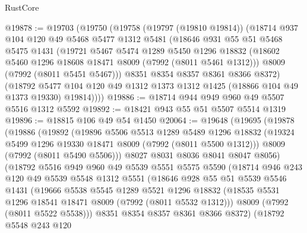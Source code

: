 \begin{lexlean}{RustCore}
\begin{coremodule}
@19878 := @19703
    (@19750
      (@19758
        (@19797 (@19810 @19814))
        (@18714
          @937
          @104
          @120
          @49
          @5468
          @5477
          @1312
          @5481
          (@18646
            @931
            @55
            @51
            @5468
            @5475
            @1431
            (@19721
              @5467
              @5474
              @1289
              @5450
              @1296
              @18832
              (@18602 @5460 @1296 @18608 @18471 @8009 (@7992 (@8011 @5461 @1312)))
              @8009
              (@7992 (@8011 @5451 @5467)))
            @8351
            @8354
            @8357
            @8361
            @8366
            @8372)
          (@18792
            @5477
            @104
            @120
            @49
            @1312
            @1373
            @1312
            @1425
            (@18866 @104 @49 @1373 @19330)
            @19814))))
@19886 := @18714 @944 @949 @960 @49 @5507 @5516 @1312 @5592
@19892 := @18421 @943 @55 @51 @5507 @5514 @1319
@19896 := @18815 @106 @49 @54 @1450
@20064 := @19648
    (@19695
      (@19878
        (@19886
          (@19892
            (@19896
              @5506
              @5513
              @1289
              @5489
              @1296
              @18832
              (@19324 @5499 @1296 @19330 @18471 @8009 (@7992 (@8011 @5500 @1312)))
              @8009
              (@7992 (@8011 @5490 @5506)))
            @8027
            @8031
            @8036
            @8041
            @8047
            @8056)
          (@18792
            @5516
            @949
            @960
            @49
            @5539
            @5551
            @5575
            @5590
            (@18714
              @946
              @243
              @120
              @49
              @5539
              @5548
              @1312
              @5551
              (@18646
                @928
                @55
                @51
                @5539
                @5546
                @1431
                (@19666
                  @5538
                  @5545
                  @1289
                  @5521
                  @1296
                  @18832
                  (@18535 @5531 @1296 @18541 @18471 @8009 (@7992 (@8011 @5532 @1312)))
                  @8009
                  (@7992 (@8011 @5522 @5538)))
                @8351
                @8354
                @8357
                @8361
                @8366
                @8372)
              (@18792
                @5548
                @243
                @120

\end{coremodule}
\end{lexlean}
